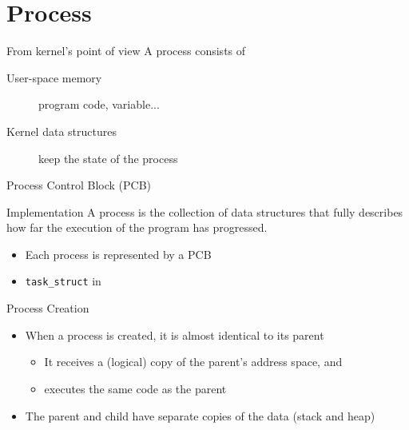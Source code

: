 \section{Process}
\label{sec:process}

\begin{frame}
  \begin{block}{From kernel's point of view}
    A process consists of
    \begin{description}
    \item[User-space memory] program code, variable...
    \item[Kernel data structures] keep the state of the process
    \end{description}
  \end{block}
\end{frame}

\begin{frame}{Process Control Block (PCB)}
  \begin{minipage}{.7\textwidth}
    \begin{block}{Implementation}
        A process is \alert{the collection of data structures} that fully describes how far
        the execution of the program has progressed.
        \begin{itemize}
        \item Each process is represented by a \alert{PCB}
        \item \texttt{task\_struct} in \linux{}
        \end{itemize}
      \end{block}
    \end{minipage}\quad
    \begin{minipage}{.2\textwidth}
      \begin{center}
      \end{center}      
    \end{minipage}
\end{frame}

\begin{frame}{Process Creation}
  \mode<beamer>{ \texttt{[image: process-creation]} }%

  \begin{itemize}
  \item When a process is created, it is almost identical to its parent
    \begin{itemize}
    \item It receives a (logical) copy of the parent's address space, and
    \item executes the same code as the parent
    \end{itemize}
  \item The parent and child have separate copies of the data (stack and heap)
  \end{itemize}
\end{frame}

